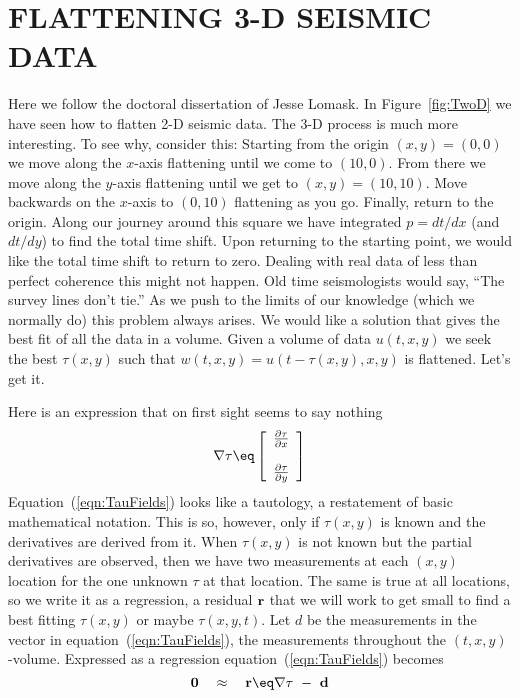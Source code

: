 \section{FLATTENING 3-D SEISMIC DATA}

Here we follow the doctoral dissertation of Jesse Lomask.
In Figure~\ref{fig:TwoD} we have seen how to flatten 2-D seismic data.
The 3-D process is much more interesting. 
To see why,
consider this: Starting from the origin $(x , y ) = (0, 0)$
we move along the $x$-axis flattening until we come to $(10, 0)$.
From there we move along the $y$-axis flattening until we get to
$(x , y ) = (10, 10)$.
Move backwards on the $x$-axis to $(0, 10)$ flattening as you go.
Finally, return to the origin.
Along our journey around this square we have integrated
$p = d t /d x$ (and $d t /d y$) to find the total time shift.
Upon returning to the starting point,
we would like the total time shift to return to zero. 
Dealing with real data of less than perfect coherence this might not happen.
Old time seismologists would say, ``The survey lines don't tie.''
As we push to the limits of our knowledge (which we normally do)
this problem always arises.
We would like a solution that gives the best fit of all the data in a volume.
Given a volume of data $u (t , x , y )$ we seek
the best $\tau (x , y )$ such that
$w(t , x , y )= u (t-\tau (x , y ), x , y )$
is  flattened. Let's get it. 
\par
Here is an expression that on first sight seems to say nothing
\begin{equation}
\nabla \tau \eq 
\left[
\begin{array}{c}
\frac{\partial \tau}{\partial x} \\
\\
\frac{\partial \tau}{\partial y}
\end{array}
\right] \label{eqn:TauFields}
\end{equation}
Equation~(\ref{eqn:TauFields}) looks like a tautology,
a restatement of basic mathematical notation. 
This is so, however,
only if $\tau (x , y )$ is known and the derivatives are derived from it.
When $\tau (x , y )$ is not known but the partial derivatives are observed,
then we have two measurements at each $(x , y )$ location
for the one unknown $\tau$ at that location. 
The same is true at all locations,
so we write it as a regression, a residual ${\bf r}$ that we 
will work to get small to find a best fitting
$\tau (x , y )$ or maybe $\tau (x , y , t )$.
Let $d$ be the measurements in the vector in equation~(\ref{eqn:TauFields}),
the measurements throughout the $(t , x , y )$-volume.
Expressed as a regression equation~(\ref{eqn:TauFields}) becomes 
\begin{equation}
{\bf 0} \quad \approx\quad  {\bf r} \eq \nabla \tau \ -\  {\bf d}
\end{equation}

